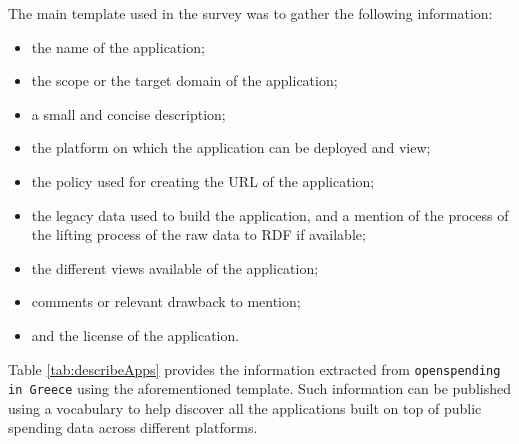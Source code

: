 The main template used in the survey was to gather the following information:
\begin{itemize}
\item the name of the application;
\item the scope or the target domain of the application;
\item a small and concise description;
\item the platform on which the application can be deployed and view;
\item the policy used for creating the URL of the application;
\item the legacy data used to build the application, and a mention of the process of the lifting process of the raw data to RDF if available;
\item the different views available of the application;
\item comments or relevant drawback to mention;
\item and the license of the application.
\end{itemize}
 Table \ref{tab:describeApps} provides the information extracted from \texttt{openspending in Greece} using the aforementioned template. Such information can be published using a vocabulary to help discover all the applications built on top of public spending data across different platforms. 



   


